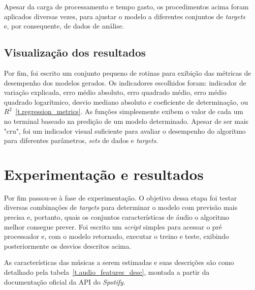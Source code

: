 Apesar da carga de processamento e tempo gasto, os procedimentos acima foram aplicados diversas vezes, para ajustar o modelo a diferentes conjuntos de \textit{targets} e, por consequente, de dados de análise.

\subsection{Visualização dos resultados}
\label{c.visualizador}

Por fim, foi escrito um conjunto pequeno de rotinas para exibição das métricas de desempenho dos modelos gerados. Os indicadores escolhidos foram: indicador de variação explicada, erro médio absoluto, erro quadrado médio, erro médio quadrado logarítmico, desvio mediano absoluto e coeficiente de determinação, ou $R^2$~\ref{t.regression_metrics}. As funções simplesmente exibem o valor de cada um no terminal baseado na predição de um modelo determinado. Apesar de ser mais "cru", foi um indicador visual suficiente para avaliar o desempenho do algoritmo para diferentes parâmetros, \textit{sets} de dados e \textit{targets}.

\section{Experimentação e resultados}
\label{c.experimentacao}

Por fim passou-se à fase de experimentação. O objetivo dessa etapa foi testar diversas combinações de \textit{targets} para determinar o modelo com previsão mais precisa e, portanto, quais os conjuntos características de áudio o algoritmo melhor consegue prever. Foi escrito um \textit{script} simples para acessar o pré processador e, com o modelo retornado, executar o treino e teste, exibindo posteriormente os desvios descritos acima.

As características das músicas a serem estimadas e suas descrições são como detalhado pela tabela~\ref{t.audio_features_desc}, montada a partir da documentação oficial da API do \textit{Spotify}.

